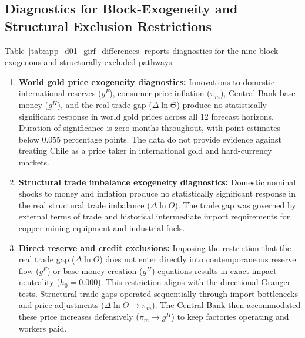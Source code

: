 \subsection{Diagnostics for Block-Exogeneity and Structural Exclusion Restrictions}
Table~\ref{tab:app_d01_girf_differences} reports diagnostics for the nine block-exogenous and structurally excluded pathways:
\begin{enumerate}[leftmargin=*,itemsep=1pt]
    \item \textbf{World gold price exogeneity diagnostics:} Innovations to domestic international reserves ($g^F$), consumer price inflation ($\pi_m$), Central Bank base money ($g^H$), and the real trade gap ($\Delta\ln\Theta$) produce no statistically significant response in world gold prices across all 12 forecast horizons. Duration of significance is zero months throughout, with point estimates below $0.055$ percentage points. The data do not provide evidence against treating Chile as a price taker in international gold and hard-currency markets.
    \item \textbf{Structural trade imbalance exogeneity diagnostics:} Domestic nominal shocks to money and inflation produce no statistically significant response in the real structural trade imbalance ($\Delta\ln\Theta$). The trade gap was governed by external terms of trade and historical intermediate import requirements for copper mining equipment and industrial fuels.
    \item \textbf{Direct reserve and credit exclusions:} Imposing the restriction that the real trade gap ($\Delta\ln\Theta$) does not enter directly into contemporaneous reserve flow ($g^F$) or base money creation ($g^H$) equations results in exact impact neutrality ($h_0 = 0.000$). This restriction aligns with the directional Granger tests. Structural trade gaps operated sequentially through import bottlenecks and price adjustments ($\Delta\ln\Theta \to \pi_m$). The Central Bank then accommodated these price increases defensively ($\pi_m \to g^H$) to keep factories operating and workers paid.
\end{enumerate}
